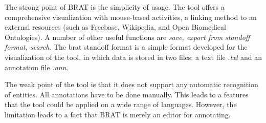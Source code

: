 The strong point of BRAT is the simplicity of usage. The tool offers a comprehensive visualization with mouse-based 
activities, a linking method to an external resources (such as Freebase, Wikipedia, and Open Biomedical Ontologies). A number 
of other useful functions are \textit{save, export from standoff format, search}. The brat standoff format is a simple 
format developed for the visualization of the tool, in which data is stored in two files: a text file \textit{.txt} and an
annotation file \textit{.ann}.

The weak point of the tool is that it does not support any automatic recognition of entities. All annotations have to be
done manually. This leads to a features that the tool could be applied on a wide range of languages. However, the 
limitation leads to a fact that BRAT is merely an editor for annotating.


